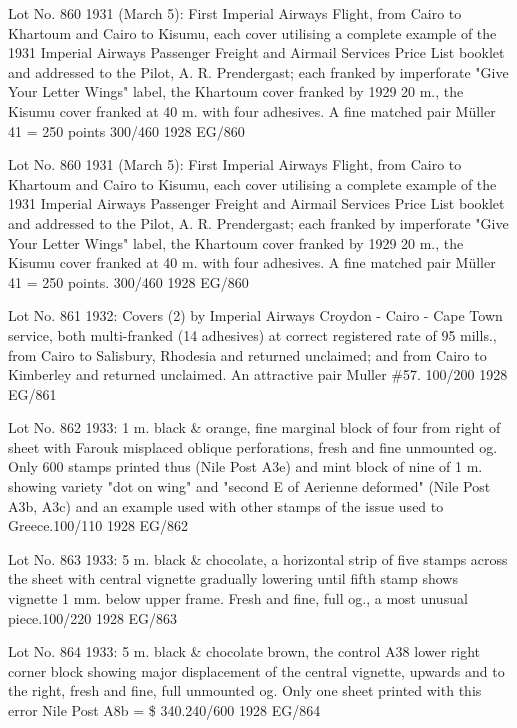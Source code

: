 \documentclass[justified]{tufte-book}
\begin{document}
%
{Lot No. 860
1931 (March 5): First Imperial Airways Flight, from Cairo to Khartoum and Cairo to Kisumu, each cover utilising a complete example of the 1931 Imperial Airways Passenger Freight and Airmail Services Price List booklet and addressed to the Pilot, A. R. Prendergast; each franked by imperforate "Give Your Letter Wings" label, the Khartoum cover franked by 1929 20 m., the Kisumu cover franked at 40 m. with four adhesives. A fine matched pair Müller 41 = 250 points 300/460  }%
{1928}%
{EG/860}%
{}%
{}
{}%
{}

%
{Lot No. 860
1931 (March 5): First Imperial Airways Flight, from Cairo to Khartoum and Cairo to Kisumu, each cover utilising a complete example of the 1931 Imperial Airways Passenger Freight and Airmail Services Price List booklet and addressed to the Pilot, A. R. Prendergast; each franked by imperforate "Give Your Letter Wings" label, the Khartoum cover franked by 1929 20 m., the Kisumu cover franked at 40 m. with four adhesives. A fine matched pair Müller 41 = 250 points. 300/460  }%
{1928}%
{EG/860}%
{}%
{}
{}%
{}

%
{Lot No. 861
1932: Covers (2) by Imperial Airways Croydon - Cairo - Cape Town service, both multi-franked (14 adhesives) at correct registered rate of 95 mills., from Cairo to Salisbury, Rhodesia and returned unclaimed; and from Cairo to Kimberley and returned unclaimed. An attractive pair Muller \#57.  100/200 }%
{1928}%
{EG/861}%
{}%
{}
{}%
{}


%
{Lot No. 862
1933: 1 m. black \& orange, fine marginal block of four from right of sheet with Farouk misplaced oblique perforations, fresh and fine unmounted og. Only 600 stamps printed thus (Nile Post A3e) and mint block of nine of 1 m. showing variety "dot on wing" and "second E of Aerienne deformed" (Nile Post A3b, A3c) and an example used with other stamps of the issue used to Greece.100/110  }%
{1928}%
{EG/862}%
{}%
{}
{}%
{}

%
{Lot No. 863
1933: 5 m. black \& chocolate, a horizontal strip of five stamps across the sheet with central vignette gradually lowering until fifth stamp shows vignette 1 mm. below upper frame. Fresh and fine, full og., a most unusual piece.100/220  }%
{1928}%
{EG/863}%
{}%
{}
{}%
{}


%
{Lot No. 864
1933: 5 m. black \& chocolate brown, the control A38 lower right corner block showing major displacement of the central vignette, upwards and to the right, fresh and fine, full unmounted og. Only one sheet printed with this error Nile Post A8b = \$ 340.240/600  }%
{1928}%
{EG/864}%
{}%
{}
{}%
{}
\end{document}
